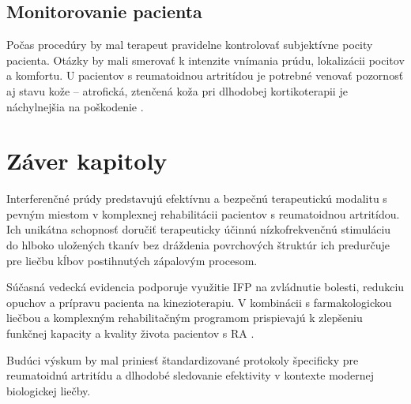 \subsection{Monitorovanie pacienta}
Počas procedúry by mal terapeut pravidelne kontrolovať subjektívne pocity pacienta. Otázky by mali smerovať k intenzite vnímania prúdu, lokalizácii pocitov a komfortu. U pacientov s reumatoidnou artritídou je potrebné venovať pozornosť aj stavu kože – atrofická, ztenčená koža pri dlhodobej kortikoterapii je náchylnejšia na poškodenie \parencite{Watson2020}.

\section{Záver kapitoly}

Interferenčné prúdy predstavujú efektívnu a bezpečnú terapeutickú modalitu s pevným miestom v komplexnej rehabilitácii pacientov s reumatoidnou artritídou. Ich unikátna schopnosť doručiť terapeuticky účinnú nízkofrekvenčnú stimuláciu do hlboko uložených tkanív bez dráždenia povrchových štruktúr ich predurčuje pre liečbu kĺbov postihnutých zápalovým procesom.

Súčasná vedecká evidencia podporuje využitie IFP na zvládnutie bolesti, redukciu opuchov a prípravu pacienta na kinezioterapiu. V kombinácii s farmakologickou liečbou a komplexným rehabilitačným programom prispievajú k zlepšeniu funkčnej kapacity a kvality života pacientov s RA \parencite{Rampazo2022, Fuentes2010}.

Budúci výskum by mal priniesť štandardizované protokoly špecificky pre reumatoidnú artritídu a dlhodobé sledovanie efektivity v kontexte modernej biologickej liečby.
